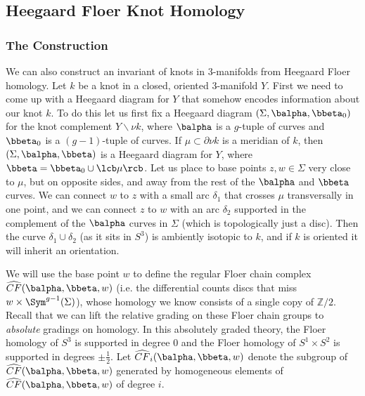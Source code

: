 \subsection{Heegaard Floer Knot Homology}
\label{Heegaard Floer Knot Homology}


\subsubsection{The Construction}


We can also construct an invariant of knots in 3-manifolds from Heegaard Floer homology. Let $k$ be a knot in a closed, oriented 3-manifold $Y$. First we need to come up with a Heegaard diagram for $Y$ that somehow encodes information about our knot $k$. To do this let us first fix a Heegaard diagram $(\Sigma,\balpha,\bbeta_0)$ for the knot complement $Y \backslash \nu k$, where $\balpha$ is a $g$-tuple of curves and $\bbeta_0$ is a $(g-1)$-tuple of curves. If $\mu \subset \partial \nu k$ is a meridian of $k$, then $(\Sigma,\balpha,\bbeta)$ is a Heegaard diagram for $Y$, where $\bbeta = \bbeta_0 \cup \lcb \mu \rcb$. Let us place to base points $z,w \in \Sigma$ very close to $\mu$, but on opposite sides, and away from the rest of the $\balpha$ and $\bbeta$ curves. We can connect $w$ to $z$ with a small arc $\delta_1$ that crosses $\mu$ transversally in one point, and we can connect $z$ to $w$ with an arc $\delta_2$ supported in the complement of the $\balpha$ curves in $\Sigma$ (which is topologically just a disc). Then the curve $\delta_1 \cup \delta_2$ (as it sits in $S^3$) is ambiently isotopic to $k$, and if $k$ is oriented it will inherit an orientation.

We will use the base point $w$ to define the regular Floer chain complex $\widehat{CF}(\balpha,\bbeta,w)$ (i.e. the differential counts discs that miss $w \times \Sym^{g-1}(\Sigma)$), whose homology we know consists of a single copy of $\mathbb Z/2$. Recall that we can lift the relative grading on these Floer chain groups to \emph{absolute} gradings on homology. In this absolutely graded theory, the Floer homology of $S^3$ is supported in degree 0 and the Floer homology of $S^1 \times S^2$ is supported in degrees $\pm \frac{1}{2}$. Let $\widehat{CF}_i(\balpha,\bbeta,w)$ denote the subgroup of $\widehat{CF}(\balpha,\bbeta,w)$ generated by homogeneous elements of $\widehat{CF}(\balpha,\bbeta,w)$ of degree $i$.

